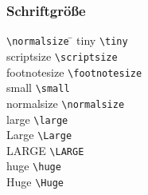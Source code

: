 
\subsubsection*{Schriftgröße }
\negAbstand
{}
\begin{tabbing}
		\lstinline|\normalsize|	\hspace{1em}	\=  \kill
		\tiny{tiny}						\> \lstinline|\tiny| 				 	\\
		\scriptsize{scriptsize}			\> \lstinline|\scriptsize|   	\\
		\footnotesize{footnotesize}	\> \lstinline|\footnotesize|	\\
		\small{small}					\> \lstinline|\small| 			  \\
		\normalsize{normalsize}			\> \lstinline|\normalsize| 	  \\
		\large{large}								\> \lstinline|\large| 			  \\
		\Large{Large}								\> \lstinline|\Large| 			  \\
		\LARGE{LARGE}								\> \lstinline|\LARGE| 			 	\\
		\huge{huge}									\> \lstinline|\huge| 				  \\
		\Huge{Huge}									\> \lstinline|\Huge| 					\\
\end{tabbing}

\vspace{-2\baselineskip}
%
